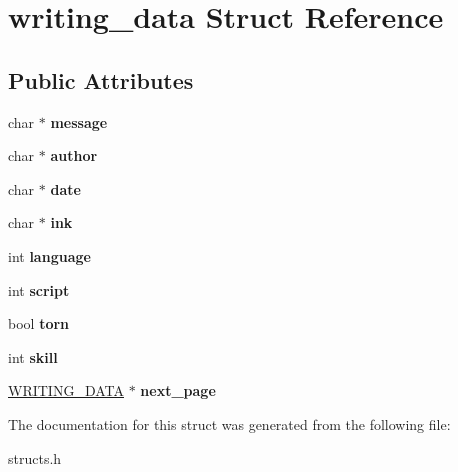 \hypertarget{structwriting__data}{\section{writing\-\_\-data Struct Reference}
\label{structwriting__data}
}
\subsection*{Public Attributes}
\begin{DoxyCompactItemize}
\item 
\hypertarget{structwriting__data_a84940ea582ca31116e5e0f4745ed1c74}{char $\ast$ {\bfseries message}}\label{structwriting__data_a84940ea582ca31116e5e0f4745ed1c74}

\item 
\hypertarget{structwriting__data_a9129b7e95050122469d4f55b97f88aa5}{char $\ast$ {\bfseries author}}\label{structwriting__data_a9129b7e95050122469d4f55b97f88aa5}

\item 
\hypertarget{structwriting__data_ac155d771cd707ded96c253da837111d1}{char $\ast$ {\bfseries date}}\label{structwriting__data_ac155d771cd707ded96c253da837111d1}

\item 
\hypertarget{structwriting__data_ae6042cc8593e6b92b63704ba71a38adb}{char $\ast$ {\bfseries ink}}\label{structwriting__data_ae6042cc8593e6b92b63704ba71a38adb}

\item 
\hypertarget{structwriting__data_a6c24b92af8363e7e5519ab1fbcd860c3}{int {\bfseries language}}\label{structwriting__data_a6c24b92af8363e7e5519ab1fbcd860c3}

\item 
\hypertarget{structwriting__data_a05f9528e28940d5de9e5f4c8387b5670}{int {\bfseries script}}\label{structwriting__data_a05f9528e28940d5de9e5f4c8387b5670}

\item 
\hypertarget{structwriting__data_afabab5b644ad0e669286c930131177a9}{bool {\bfseries torn}}\label{structwriting__data_afabab5b644ad0e669286c930131177a9}

\item 
\hypertarget{structwriting__data_a8752da7cd404f940f5168e2f805d2de9}{int {\bfseries skill}}\label{structwriting__data_a8752da7cd404f940f5168e2f805d2de9}

\item 
\hypertarget{structwriting__data_ab39fee813d85da5295d94fd8ad12be33}{\hyperlink{structwriting__data}{W\-R\-I\-T\-I\-N\-G\-\_\-\-D\-A\-T\-A} $\ast$ {\bfseries next\-\_\-page}}\label{structwriting__data_ab39fee813d85da5295d94fd8ad12be33}

\end{DoxyCompactItemize}


The documentation for this struct was generated from the following file\-:\begin{DoxyCompactItemize}
\item 
structs.\-h\end{DoxyCompactItemize}
